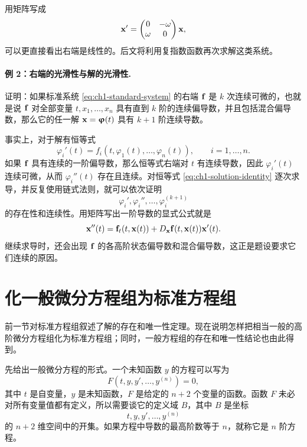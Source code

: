 用矩阵写成
\[
 \vect{x}'=
 \begin{pmatrix}
  0&-\omega\\
  \omega&0
 \end{pmatrix}\vect{x},
\]
可以更直接看出右端是线性的。后文将利用复指数函数再次求解这类系统。

\paragraph{例 2：右端的光滑性与解的光滑性.}
证明：如果标准系统 \eqref{eq:ch1-standard-system} 的右端 \(\vect{f}\) 是 \(k\) 次连续可微的，也就是说 \(\vect{f}\) 对全部变量 \(t,x_1,\ldots,x_n\) 具有直到 \(k\) 阶的连续偏导数，并且包括混合偏导数，那么它的任一解 \(\vect{x}=\vect{\varphi}(t)\) 具有 \(k+1\) 阶连续导数。

事实上，对于解有恒等式
\begin{equation}
 \varphi_i'(t)=f_i(t,\varphi_1(t),\ldots,\varphi_n(t)),
 \qquad i=1,\ldots,n.
 \label{eq:ch1-solution-identity}
\end{equation}
如果 \(\vect{f}\) 具有连续的一阶偏导数，那么恒等式右端对 \(t\) 有连续导数，因此 \(\varphi_i'(t)\) 连续可微，从而 \(\varphi_i''(t)\) 存在且连续。对恒等式 \eqref{eq:ch1-solution-identity} 逐次求导，并反复使用链式法则，就可以依次证明
\[
 \varphi_i',\varphi_i'',\ldots,\varphi_i^{(k+1)}
\]
的存在性和连续性。用矩阵写出一阶导数的显式公式就是
\[
 \vect{x}''(t)
 =\vect{f}_t(t,\vect{x}(t))+D_{\vect{x}}\vect{f}(t,\vect{x}(t))\vect{x}'(t).
\]
继续求导时，还会出现 \(\vect{f}\) 的各高阶状态偏导数和混合偏导数，这正是题设要求它们连续的原因。

\section{化一般微分方程组为标准方程组}

前一节对标准方程组叙述了解的存在和唯一性定理。现在说明怎样把相当一般的高阶微分方程组化为标准方程组；同时，一般方程组的存在和唯一性结论也由此得到。

先给出一般微分方程的形式。一个未知函数 \(y\) 的方程可以写为
\begin{equation}
 F(t,y,y',\ldots,y^{(n)})=0,
 \label{eq:ch1-general-high-order}
\end{equation}
其中 \(t\) 是自变量，\(y\) 是未知函数，\(F\) 是给定的 \(n+2\) 个变量的函数。函数 \(F\) 未必对所有变量值都有定义，所以需要谈它的定义域 \(B\)，其中 \(B\) 是坐标
\[
 t,y,y',\ldots,y^{(n)}
\]
的 \(n+2\) 维空间中的开集。如果方程中导数的最高阶数等于 \(n\)，就称它是 \(n\) 阶方程。

